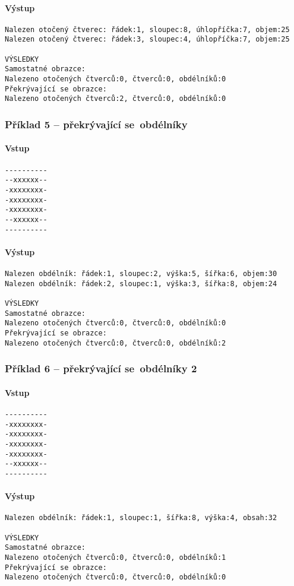 \documentclass[12pt]{article}
\begin{document}
\paragraph{Výstup}
\begin{verbatim}
Nalezen otočený čtverec: řádek:1, sloupec:8, úhlopříčka:7, objem:25
Nalezen otočený čtverec: řádek:3, sloupec:4, úhlopříčka:7, objem:25

VÝSLEDKY
Samostatné obrazce:
Nalezeno otočených čtverců:0, čtverců:0, obdélníků:0
Překrývající se obrazce:
Nalezeno otočených čtverců:2, čtverců:0, obdélníků:0
\end{verbatim}

\subsubsection{Příklad 5 -- překrývající se~obdélníky}
\paragraph{Vstup}
\begin{verbatim}
----------
--xxxxxx--
-xxxxxxxx-
-xxxxxxxx-
-xxxxxxxx-
--xxxxxx--
----------
\end{verbatim}
\paragraph{Výstup}
\begin{verbatim}
Nalezen obdélník: řádek:1, sloupec:2, výška:5, šířka:6, objem:30 
Nalezen obdélník: řádek:2, sloupec:1, výška:3, šířka:8, objem:24 

VÝSLEDKY
Samostatné obrazce:
Nalezeno otočených čtverců:0, čtverců:0, obdélníků:0
Překrývající se obrazce:
Nalezeno otočených čtverců:0, čtverců:0, obdélníků:2
\end{verbatim}

\subsubsection{Příklad 6 -- překrývající se~obdélníky 2}
\paragraph{Vstup}
\begin{verbatim}
----------
-xxxxxxxx-
-xxxxxxxx-
-xxxxxxxx-
-xxxxxxxx-
--xxxxxx--
----------
\end{verbatim}
\paragraph{Výstup}
\begin{verbatim}
Nalezen obdélník: řádek:1, sloupec:1, šířka:8, výška:4, obsah:32 

VÝSLEDKY
Samostatné obrazce:
Nalezeno otočených čtverců:0, čtverců:0, obdélníků:1
Překrývající se obrazce:
Nalezeno otočených čtverců:0, čtverců:0, obdélníků:0
\end{verbatim}
\end{document}
